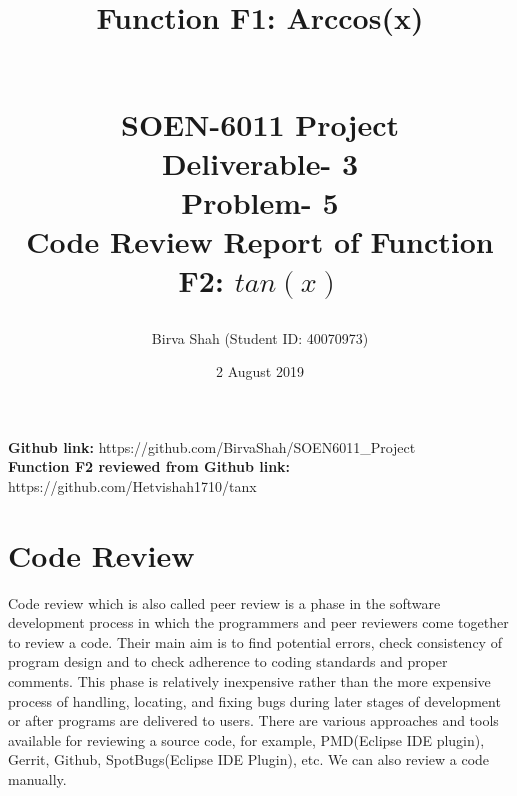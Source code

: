 \documentclass[10pt,letterpaper]{article}
\title{Function F1: Arccos(x)
\begin{large}
\\\Large SOEN-6011 Project\\
\LARGE Deliverable- 3
\\\Large Problem- 5
\\\Large Code Review Report of Function F2: $tan(x)$
\end{large}
}
\author{Birva Shah (Student ID: 40070973) }
\date{2 August 2019}
\begin{document}
\maketitle
\textbf{Github link:} https://github.com/BirvaShah/SOEN6011\_Project
\\
\textbf{Function F2 reviewed from Github link:} https://github.com/Hetvishah1710/tanx 
\section{Code Review}
Code review which is also called peer review is a phase in the software development process in which the programmers and peer reviewers come together to review a code. Their main aim is to find potential errors, check consistency of program design and to check adherence to coding standards and proper comments. This phase is relatively inexpensive rather than the more expensive process of handling, locating, and fixing bugs during later stages of development or after programs are delivered to users. There are various approaches and tools available for reviewing a source code, for example, PMD(Eclipse IDE plugin), Gerrit, Github, SpotBugs(Eclipse IDE Plugin), etc. We can also review a code manually. 
\end{document}
